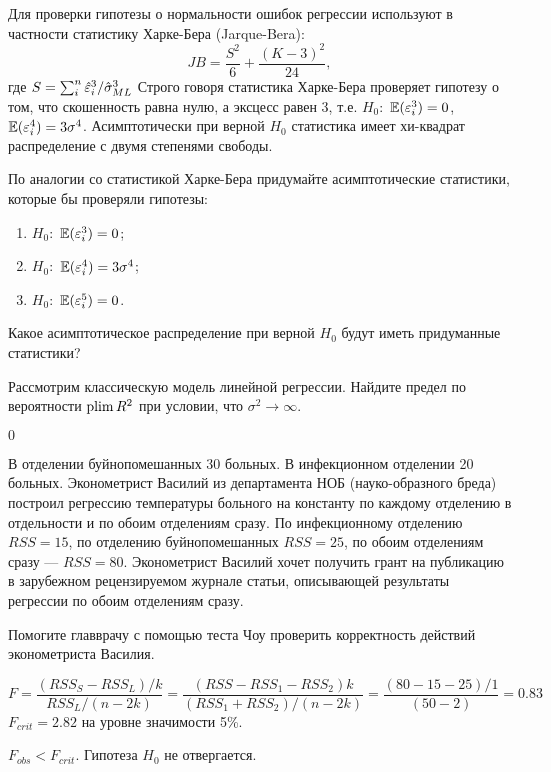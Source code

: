 \begin{problem}
Для проверки гипотезы о нормальности ошибок регрессии используют в частности статистику Харке-Бера (Jarque-Bera):
\[
JB=\frac{S^2}{6} + \frac{(K-3)^2}{24},
\]
где $S=\sum_i^n \hat{\varepsilon}_i^3 /\hat{\sigma}^3_{ML}$
Строго говоря статистика Харке-Бера проверяет гипотезу о том, что скошенность равна нулю, а эксцесс равен 3, т.е. $H_0:$ $\mathbb{E}(\varepsilon_i^3)=0$, $\mathbb{E}(\varepsilon_i^4)=3\sigma^4$. Асимптотически при верной $H_0$ статистика имеет хи-квадрат распределение с двумя степенями свободы.

По аналогии со статистикой Харке-Бера придумайте асимптотические статистики, которые бы проверяли гипотезы:
\begin{enumerate}
\item $H_0:$ $\mathbb{E}(\varepsilon_i^3)=0$;
\item $H_0:$ $\mathbb{E}(\varepsilon_i^4)=3\sigma^4$;
\item $H_0:$ $\mathbb{E}(\varepsilon_i^5)=0$.
\end{enumerate}
Какое асимптотическое распределение при верной $H_0$ будут иметь придуманные статистики?

\begin{sol}
\end{sol}
\end{problem}



\begin{problem}
Рассмотрим классическую модель линейной регрессии. Найдите предел по вероятности $\operatorname*{plim} R^2$ при условии, что $\sigma^2 \rightarrow \infty$.

\begin{sol}
$0$
\end{sol}
\end{problem}



\begin{problem} %
В отделении буйнопомешанных 30 больных. В инфекционном отделении 20 больных. 
Эконометрист Василий из департамента НОБ (науко-образного бреда) 
построил регрессию температуры больного на константу 
по каждому отделению в отдельности и по обоим отделениям сразу. 
По инфекционному отделению $RSS=15$, по отделению буйнопомешанных $RSS=25$, 
по обоим отделениям сразу — $RSS=80$. 
Эконометрист Василий хочет получить грант на публикацию в зарубежном рецензируемом журнале статьи, 
описывающей результаты регрессии по обоим отделениям сразу.

Помогите главврачу с помощью теста Чоу проверить корректность действий эконометриста Василия.


\begin{sol}
  \[
    F = \frac{(RSS_S-RSS_{L})/k}{RSS_{L}/(n-2k)}=\frac{(RSS-RSS_1-RSS_2)k}{(RSS_1+RSS_2)/(n-2k)}=\frac{(80-15-25)/1}{(50-2)}=0.83
  \]
    $F_{crit}=2.82$ на уровне значимости 5\%.
    
    $F_{obs}<F_{crit}$. Гипотеза $H_0$ не отвергается. 
\end{sol}
\end{problem}



